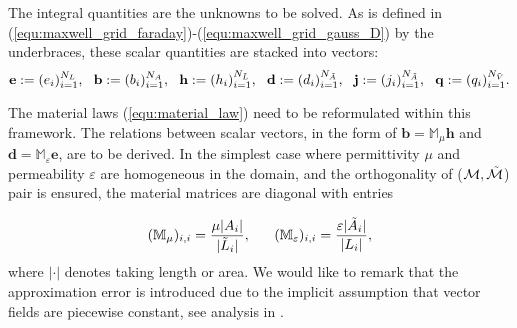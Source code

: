 \documentclass{article}
\begin{document}
The integral quantities are the unknowns to be solved. As is defined in (\ref{equ:maxwell_grid_faraday})-(\ref{equ:maxwell_grid_gauss_D}) by the underbraces, these scalar quantities are stacked into vectors:
\begin{equation} \label{equ:fit_scale_vector}
    \mathbf{e} := (e_i)_{i=1}^{N_L},\ \ \mathbf{b} := (b_i)_{i=1}^{N_A}, \ \ \mathbf{h} := (h_i)_{i=1}^{N_{\Tilde{L}}}, \ \ \mathbf{d} := (d_i)_{i=1}^{N_{\Tilde{A}}}, \ \ \mathbf{j} := (j_i)_{i=1}^{N_{\Tilde{A}}}, \ \ \mathbf{q} := (q_i)_{i=1}^{N_{\Tilde{V}}}.
\end{equation}

The material laws (\ref{equ:material_law}) need to be reformulated within this framework. The relations between scalar vectors, in the form of $\mathbf{b} = \mathbb{M}_\mu \mathbf{h}$ and $\mathbf{d} = \mathbb{M}_\varepsilon \mathbf{e}$, are to be derived. In the simplest case where permittivity $\mu$ and permeability $\varepsilon$ are homogeneous in the domain, and the orthogonality of ($\mathcal{M}, \Tilde{\mathcal{M}}$) pair is ensured, the material matrices are diagonal with entries 

\begin{equation*}
    (\mathbb{M}_\mu)_{i,i} = \frac{\mu|A_i|}{|\Tilde{L}_i|}, \ \ \ \ \ (\mathbb{M}_\varepsilon)_{i,i} = \frac{\varepsilon |\Tilde{A}_i|}{|L_i|},
\end{equation*}
where $|\cdot|$ denotes taking length or area. We would like to remark that the approximation error is introduced due to the implicit assumption that vector fields are piecewise constant, see analysis in \cite{Marrone_2001}.
\end{document}
